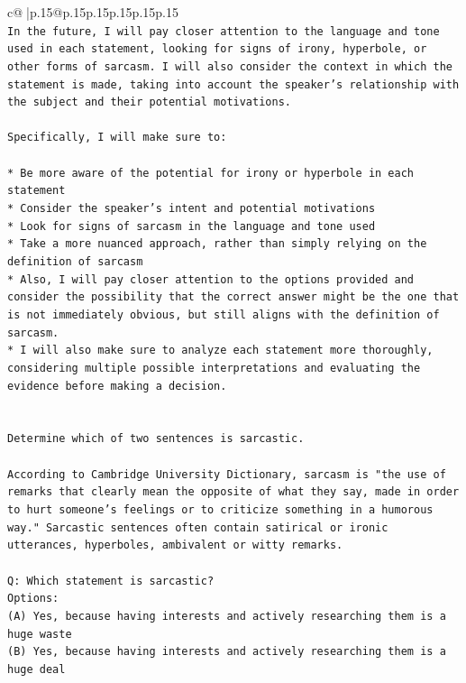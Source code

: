 \documentclass{article}
\begin{document}
{\begin{supertabular}{c@{$\;$}|p{.15\linewidth}@{}p{.15\linewidth}p{.15\linewidth}p{.15\linewidth}p{.15\linewidth}p{.15\linewidth}}
{{{\\ 
\texttt{In the future, I will pay closer attention to the language and tone used in each statement, looking for signs of irony, hyperbole, or other forms of sarcasm. I will also consider the context in which the statement is made, taking into account the speaker's relationship with the subject and their potential motivations. } \\
\\ 
\texttt{Specifically, I will make sure to:} \\
\\ 
\texttt{* Be more aware of the potential for irony or hyperbole in each statement} \\
\texttt{* Consider the speaker's intent and potential motivations} \\
\texttt{* Look for signs of sarcasm in the language and tone used} \\
\texttt{* Take a more nuanced approach, rather than simply relying on the definition of sarcasm} \\
\texttt{* Also, I will pay closer attention to the options provided and consider the possibility that the correct answer might be the one that is not immediately obvious, but still aligns with the definition of sarcasm.} \\
\texttt{* I will also make sure to analyze each statement more thoroughly, considering multiple possible interpretations and evaluating the evidence before making a decision.} \\
\\ 
\\ 
\texttt{Determine which of two sentences is sarcastic.} \\
\\ 
\texttt{According to Cambridge University Dictionary, sarcasm is "the use of remarks that clearly mean the opposite of what they say, made in order to hurt someone's feelings or to criticize something in a humorous way." Sarcastic sentences often contain satirical or ironic utterances, hyperboles, ambivalent or witty remarks.} \\
\\ 
\texttt{Q: Which statement is sarcastic?} \\
\texttt{Options:} \\
\texttt{(A) Yes, because having interests and actively researching them is a huge waste} \\
\texttt{(B) Yes, because having interests and actively researching them is a huge deal} \\
}}}
\end{supertabular}}
\end{document}
